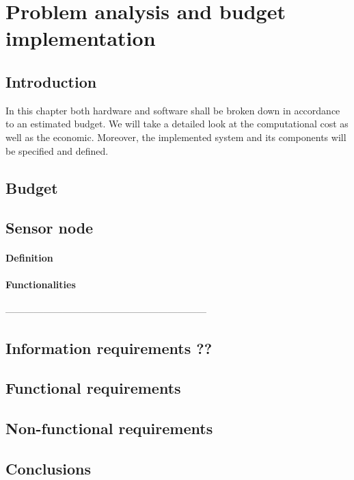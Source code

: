 \chapter{Problem analysis and budget implementation}\label{cap:analisis}

\section{Introduction}
In this chapter both hardware and software shall be broken down in accordance to an estimated budget. We will take a detailed look at the computational cost as well as the economic. Moreover, the implemented system and its components will be specified and defined.

\section{Budget}

\section{Sensor node}
\subsubsection{Definition}
\subsubsection{Functionalities}
---------------------------------------------------------------
\section{Information requirements ??}

\section{Functional requirements}

\section{Non-functional requirements}

\section{Conclusions}

